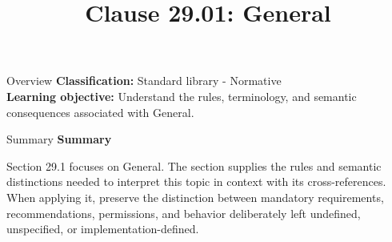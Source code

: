 \documentclass[10pt,letterpaper]{article}
\title{Clause 29.01: General}
\author{}
\date{}
\begin{document}
\maketitle
\begin{CornellOverviewBox}{Overview}
\textbf{Classification:} Standard library - Normative\\[2pt]
\textbf{Learning objective:} Understand the rules, terminology, and semantic consequences associated with General.
\end{CornellOverviewBox}\begin{CornellSummaryBox}{Summary}
{\sffamily\bfseries\color{Accent} Summary}\par\vspace{3pt}Section 29.1 focuses on General. The section supplies the rules and semantic distinctions needed to interpret this topic in context with its cross-references. When applying it, preserve the distinction between mandatory requirements, recommendations, permissions, and behavior deliberately left undefined, unspecified, or implementation-defined.
\end{CornellSummaryBox}
\end{document}
